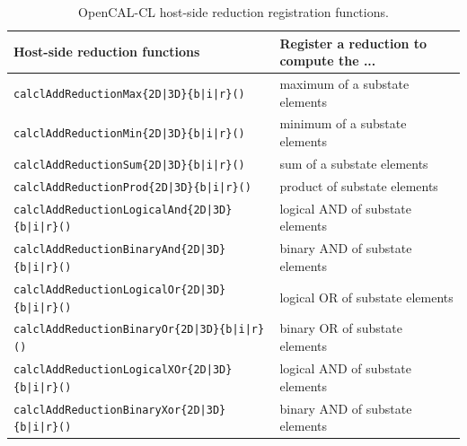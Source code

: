 \begin{table}
  \centering
  \footnotesize
  \begin{tabular}{l|l}
    \hline
    Host-side reduction functions & Register a reduction to compute the ... \\
    \hline
    \verb'calclAddReductionMax{2D|3D}{b|i|r}()'        & maximum of a substate elements\\
    \verb'calclAddReductionMin{2D|3D}{b|i|r}()'        & minimum of a substate elements\\
    \verb'calclAddReductionSum{2D|3D}{b|i|r}()'        & sum of a substate elements\\
    \verb'calclAddReductionProd{2D|3D}{b|i|r}()'       & product of substate elements\\
    \verb'calclAddReductionLogicalAnd{2D|3D}{b|i|r}()' & logical AND of substate elements\\
    \verb'calclAddReductionBinaryAnd{2D|3D}{b|i|r}()'  & binary AND of substate elements\\
    \verb'calclAddReductionLogicalOr{2D|3D}{b|i|r}()'  & logical OR of substate elements\\
    \verb'calclAddReductionBinaryOr{2D|3D}{b|i|r}()'   & binary OR of substate elements\\
    \verb'calclAddReductionLogicalXOr{2D|3D}{b|i|r}()' & logical AND of substate elements\\
    \verb'calclAddReductionBinaryXor{2D|3D}{b|i|r}()'  & binary AND of substate elements\\
    \hline
  \end{tabular}
  \caption{OpenCAL-CL host-side reduction registration functions.}
  \label{tab:calcl-host-reductions}
\end{table}


